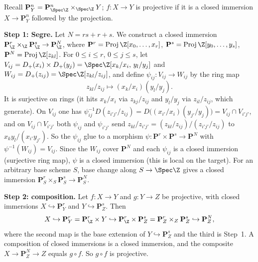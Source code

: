 \documentclass[11pt]{article}
\begin{document}
\pf
Recall $\mathbf P^n_Y=\mathbf P^n_{\Spec\Z}\times_{\Spec\Z}Y$; $f:X\to Y$ is projective if it is a closed immersion $X\to\mathbf P^n_Y$ followed by the projection.

\textbf{Step 1: Segre.} Let $N=rs+r+s$. We construct a closed immersion $\mathbf P^r_{\Z}\times_{\Z}\mathbf P^s_{\Z}\to\mathbf P^N_{\Z}$, where $\mathbf P^r=\operatorname{Proj}\Z[x_0,\dots,x_r]$, $\mathbf P^s=\operatorname{Proj}\Z[y_0,\dots,y_s]$, $\mathbf P^N=\operatorname{Proj}\Z[z_{kl}]$. For $0\le i\le r$, $0\le j\le s$, let $V_{ij}=D_+(x_i)\times D_+(y_j)=\Spec\Z[x_k/x_i,\,y_l/y_j]$ and $W_{ij}=D_+(z_{ij})=\Spec\Z[z_{kl}/z_{ij}]$, and define $\psi_{ij}:V_{ij}\to W_{ij}$ by the ring map
\[
z_{kl}/z_{ij}\longmapsto (x_k/x_i)(y_l/y_j).
\]
It is surjective on rings (it hits $x_k/x_i$ via $z_{kj}/z_{ij}$ and $y_l/y_j$ via $z_{il}/z_{ij}$, which generate). On $V_{ij}$ one has $\psi_{ij}^{-1}D(z_{i'j'}/z_{ij})=D\bigl((x_{i'}/x_i)(y_{j'}/y_j)\bigr)=V_{ij}\cap V_{i'j'}$, and on $V_{ij}\cap V_{i'j'}$ both $\psi_{ij}$ and $\psi_{i'j'}$ send $z_{kl}/z_{i'j'}=(z_{kl}/z_{ij})/(z_{i'j'}/z_{ij})$ to $x_ky_l/(x_{i'}y_{j'})$. So the $\psi_{ij}$ glue to a morphism $\psi:\mathbf P^r\times\mathbf P^s\to\mathbf P^N$ with $\psi^{-1}(W_{ij})=V_{ij}$. Since the $W_{ij}$ cover $\mathbf P^N$ and each $\psi_{ij}$ is a closed immersion (surjective ring map), $\psi$ is a closed immersion (this is local on the target). For an arbitrary base scheme $S$, base change along $S\to\Spec\Z$ gives a closed immersion $\mathbf P^r_S\times_S\mathbf P^s_S\to\mathbf P^N_S$.

\textbf{Step 2: composition.} Let $f:X\to Y$ and $g:Y\to Z$ be projective, with closed immersions $X\hookrightarrow\mathbf P^r_Y$ and $Y\hookrightarrow\mathbf P^s_Z$. Then
\[
X\hookrightarrow\mathbf P^r_Y=\mathbf P^r_{\Z}\times Y\hookrightarrow\mathbf P^r_{\Z}\times\mathbf P^s_Z=\mathbf P^r_Z\times_Z\mathbf P^s_Z\hookrightarrow\mathbf P^N_Z,
\]
where the second map is the base extension of $Y\hookrightarrow\mathbf P^s_Z$ and the third is Step~1. A composition of closed immersions is a closed immersion, and the composite $X\to\mathbf P^N_Z\to Z$ equals $g\circ f$. So $g\circ f$ is projective.
\end{document}

